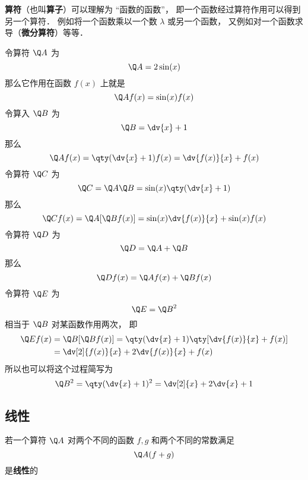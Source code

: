 

\textbf{算符}（也叫\textbf{算子}）可以理解为 “函数的函数”， 即一个函数经过算符作用可以得到另一个算符． 例如将一个函数乘以一个数 $\lambda$ 或另一个函数， 又例如对一个函数求导（\textbf{微分算符}）等等．

\begin{example}{}
令算符 $\Q A$ 为
\begin{equation}
\Q A = 2\sin(x)
\end{equation}
那么它作用在函数 $f(x)$ 上就是
\begin{equation}
\Q A f(x) = \sin(x) f(x)
\end{equation}
令算入 $\Q B$ 为
\begin{equation}
\Q B = \dv{x} + 1
\end{equation}
那么
\begin{equation}
\Q A f(x) = \qty(\dv{x} + 1)f(x) = \dv{f(x)}{x} + f(x)
\end{equation}
令算符 $\Q C$ 为
\begin{equation}
\Q C = \Q A \Q B = \sin(x) \qty(\dv{x} + 1)
\end{equation}
那么
\begin{equation}
\Q C f(x) = \Q A [\Q B f(x)] = \sin(x)\dv{f(x)}{x} + \sin(x)f(x)
\end{equation}
令算符 $\Q D$ 为
\begin{equation}
\Q D = \Q A + \Q B
\end{equation}
那么
\begin{equation}
\Q D f(x) = \Q A f(x) + \Q B f(x)
\end{equation}
令算符 $\Q E$ 为
\begin{equation}
\Q E = {\Q B}^2
\end{equation}
相当于 $\Q B$ 对某函数作用两次， 即
\begin{equation}
\begin{aligned}
\Q E f(x) &= \Q B [\Q B f(x)] = \qty(\dv{x} + 1)\qty[\dv{f(x)}{x} + f(x)] \\
&= \dv[2]{f(x)}{x} + 2\dv{f(x)}{x} + f(x)
\end{aligned}
\end{equation}
所以也可以将这个过程简写为
\begin{equation}
\Q B^2 = \qty(\dv{x} + 1)^2 = \dv[2]{x} + 2\dv{x} + 1
\end{equation}
\end{example}

\subsection{线性}
若一个算符 $\Q A$ 对两个不同的函数 $f, g$ 和两个不同的常数满足
\begin{equation}
\Q A (f + g)
\end{equation}
是\textbf{线性}的
